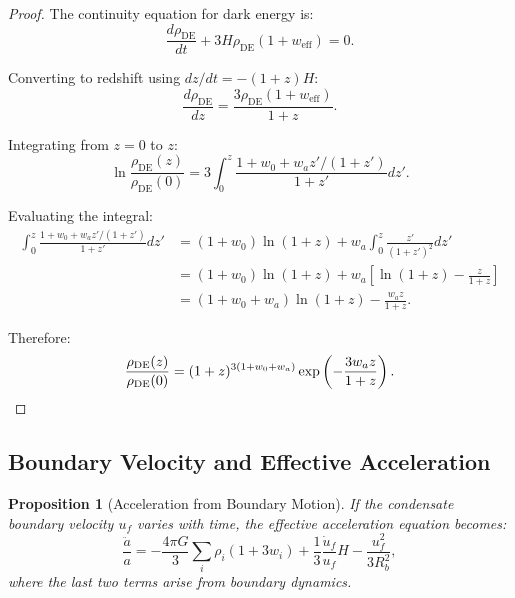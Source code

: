 \documentclass[11pt,a4paper]{article}
\newcommand{\weff}{\ensuremath{w_{\mathrm{eff}}}}
\newtheorem{proposition}[theorem]{Proposition}
\theoremstyle{definition}
\theoremstyle{remark}
\begin{document}
\begin{proof}
The continuity equation for dark energy is:
\begin{equation}
\frac{d\rho_{\mathrm{DE}}}{dt} + 3H\rho_{\mathrm{DE}}(1 + \weff) = 0.
\end{equation}

Converting to redshift using $dz/dt = -(1+z)H$:
\begin{equation}
\frac{d\rho_{\mathrm{DE}}}{dz} = \frac{3\rho_{\mathrm{DE}}(1 + \weff)}{1+z}.
\end{equation}

Integrating from $z = 0$ to $z$:
\begin{equation}
\ln\frac{\rho_{\mathrm{DE}}(z)}{\rho_{\mathrm{DE}}(0)} = 3\int_0^z \frac{1 + w_0 + w_a z'/(1+z')}{1+z'} dz'.
\end{equation}

Evaluating the integral:
\begin{align}
\int_0^z \frac{1 + w_0 + w_a z'/(1+z')}{1+z'} dz' &= (1+w_0)\ln(1+z) + w_a\int_0^z \frac{z'}{(1+z')^2} dz' \\
&= (1+w_0)\ln(1+z) + w_a\left[\ln(1+z) - \frac{z}{1+z}\right] \\
&= (1+w_0+w_a)\ln(1+z) - \frac{w_a z}{1+z}.
\end{align}

Therefore:
\begin{equation}
\frac{\rho_{\mathrm{DE}}(z)}{\rho_{\mathrm{DE}}(0)} = (1+z)^{3(1+w_0+w_a)}\exp\left(-\frac{3w_a z}{1+z}\right). \qedhere
\end{equation}
\end{proof}

\subsection{Boundary Velocity and Effective Acceleration}
\label{sec:boundary_acceleration}

\begin{proposition}[Acceleration from Boundary Motion]
\label{prop:boundary_acceleration}
If the condensate boundary velocity $u_f$ varies with time, the effective acceleration equation becomes:
\begin{equation}
\label{eq:modified_acceleration}
\frac{\ddot{a}}{a} = -\frac{4\pi G}{3}\sum_i \rho_i(1 + 3w_i) + \frac{1}{3}\frac{\dot{u}_f}{u_f}H - \frac{u_f^2}{3R_b^2},
\end{equation}
where the last two terms arise from boundary dynamics.
\end{proposition}
\end{document}
